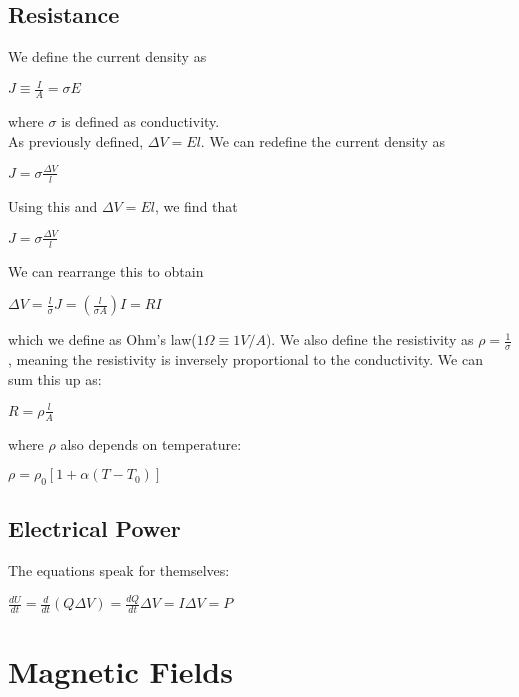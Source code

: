 \documentclass[12pt]{report}
\begin{document}
	\section{Resistance}
		We define the current density as\\
		\centerline{$J \equiv \frac{I}{A} = \sigma E$}
		where $\sigma$ is defined as conductivity.\\
		As previously defined, $\Delta V = El$. We can redefine the current density as \\
		\centerline{$J = \sigma \frac{\Delta V}{l}$}
		Using this and $\Delta V = El$, we find that \\
		\centerline{$J = \sigma \frac{\Delta V}{l}$}
		We can rearrange this to obtain \\
		\centerline{$\Delta V = \frac{l}{\sigma} J = (\frac{l}{\sigma A}) I = RI$}
		which we define as Ohm's law($1 \Omega \equiv 1 V/A$).
		We also define the resistivity as $\rho = \frac{1}{\sigma}$, meaning the resistivity is inversely proportional to the conductivity. We can sum this up as:\\
		\centerline{$R = \rho \frac{l}{A}$}
		where $\rho$ also depends on temperature:\\
		\centerline{$\rho = \rho_0 [1 + \alpha(T - T_0)]$} 
	\section{Electrical Power}
		The equations speak for themselves:\\
		\centerline{$\frac{dU}{dt} = \frac{d}{dt}(Q\Delta V) = \frac{dQ}{dt}\Delta V = I\Delta V = P$}
\chapter{Magnetic Fields}
\end{document}

